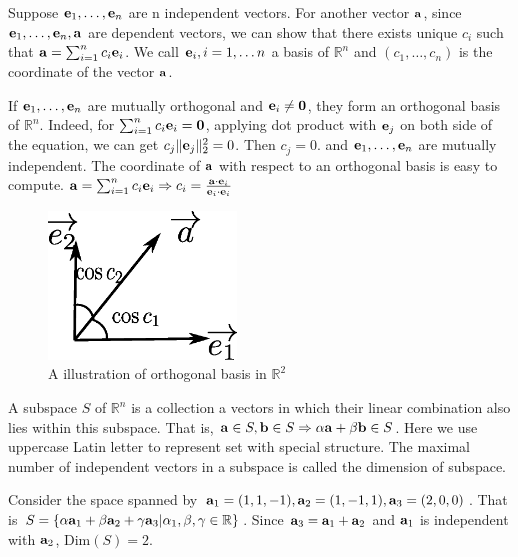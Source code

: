 Suppose $\mathbf{e}_1, \dots, \mathbf{e}_n$ are n independent vectors. For another vector $\mathbf{a}$, since
$\mathbf{e}_1, \dots, \mathbf{e}_n, \mathbf{a}$ are dependent vectors, we can show that there exists unique $c_i$ such that
$\mathbf{a} = \sum_{i=1}^n c_i \mathbf{e}_i$. We call $\mathbf{e}_i, i=1,\dots n$ a basis of $\mathbb{R}^n$ and $(c_1, \dots, c_n)$ is the coordinate of the vector $\mathbf{a}$.

If $\mathbf{e}_1, \dots, \mathbf{e}_n$ are mutually orthogonal and $\mathbf{e}_i \neq \mathbf{0}$, they form an orthogonal basis of $\mathbb{R}^n$. Indeed,  for $\sum_{i=1}^n c_i \mathbf{e}_i = \mathbf{0}$, applying dot product with $\mathbf{e}_j$ on both side of the equation, we can get $ c_j \lVert\mathbf{e}_j\rVert_2^2 = 0 $. Then $c_j = 0$. and $\mathbf{e}_1, \dots, \mathbf{e}_n$ are mutually independent. The coordinate of $\mathbf{a}$ with respect to an orthogonal basis is easy to compute. $\mathbf{a} = \sum_{i=1}^n c_i \mathbf{e}_i \Rightarrow c_i = \frac{\mathbf{a}\cdot \mathbf{e}_i}{\mathbf{e}_i\cdot \mathbf{e}_i}$
\begin{figure}[!ht]
	\centering
	\includegraphics[width=5cm]{orthogonal_basis.eps}
	\caption{A illustration of orthogonal basis in $\mathbb{R}^2$}
\end{figure}

A subspace  $S$ of $\mathbb{R}^n$ is a collection a vectors in which their linear combination also lies within this subspace. That is,
$\mathbf{a} \in S, \mathbf{b} \in S \Rightarrow \alpha \mathbf{a} + \beta \mathbf{b} \in S$. Here we use uppercase Latin letter to represent set with special structure.
The maximal number of independent vectors in a subspace is called the dimension of subspace. 
\begin{example}
Consider the space spanned by $\mathbf{a}_1 = (1,1,-1), \mathbf{a}_2=(1,-1,1), \mathbf{a}_3=(2,0,0)$. That is $S=\{\alpha \mathbf{a}_1 + \beta \mathbf{a}_2 + \gamma \mathbf{a}_3 | \alpha_1, \beta, \gamma \in \mathbb{R}\}$. Since $\mathbf{a}_3 = \mathbf{a}_1 + \mathbf{a}_2$ and $\mathbf{a}_1$ is independent with $\mathbf{a}_2$, $ \mathrm{Dim}(S) = 2$.
\end{example}
